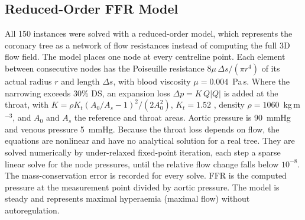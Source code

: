 \documentclass[journal]{IEEEtran}
\begin{document}
\subsection{Reduced-Order FFR Model}
All 150 instances were solved with a reduced-order model, which represents the coronary tree as a network of flow
resistances instead of computing the full 3D flow field. The model places one node at every centreline point. Each element between consecutive nodes has the Poiseuille
resistance $8\mu\,\Delta s/(\pi r^4)$ of its actual radius $r$ and length $\Delta s$, with blood viscosity
$\mu = 0.004$~Pa\,s. Where the narrowing exceeds 30\% DS, an expansion loss $\Delta p = K\,Q|Q|$ is added at the
throat, with $K = \rho K_t (A_0/A_s - 1)^2 / (2A_0^2)$, $K_t = 1.52$ \cite{young1973}, density
$\rho = 1060$~kg\,m$^{-3}$, and $A_0$ and $A_s$ the reference and throat areas. Aortic pressure is 90~mmHg and
venous pressure 5~mmHg. Because the throat loss depends on flow, the equations are nonlinear and have no analytical solution
for a real tree. They are solved numerically by under-relaxed fixed-point iteration, each step a sparse linear
solve for the node pressures, until the relative flow change falls below $10^{-8}$. The mass-conservation error is recorded for every solve. FFR is the computed
pressure at the measurement point divided by aortic pressure. The model is steady and represents maximal hyperaemia
(maximal flow) without autoregulation.
\end{document}
